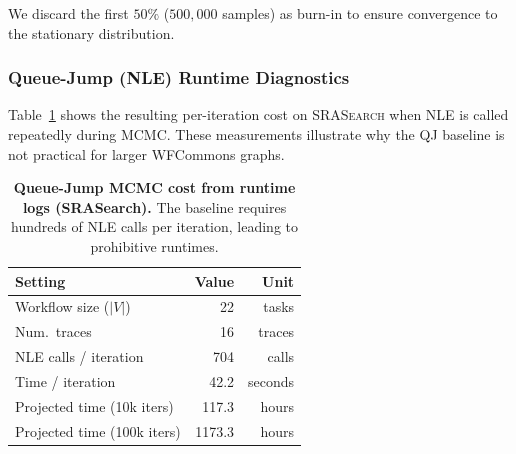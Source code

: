 \documentclass{article}
\theoremstyle{plain}
\theoremstyle{definition}
\theoremstyle{remark}
\begin{document}
We discard the first $50\%$ ($500,000$ samples) as burn-in to ensure convergence to the stationary distribution. 
\subsubsection{Queue-Jump (NLE) Runtime Diagnostics}
\label{app:qj_runtime}
Table~\ref{tab:qj_mcmc_cost} shows the resulting per-iteration
cost on \textsc{SRASearch} when NLE is called repeatedly during MCMC. These measurements illustrate why the QJ baseline
is not practical for larger WFCommons graphs.


\begin{table}[h!]
\centering
\caption{\textbf{Queue-Jump MCMC cost from runtime logs (SRASearch).}
The baseline requires hundreds of NLE calls per iteration, leading to prohibitive runtimes.}
\label{tab:qj_mcmc_cost}
\small
\setlength{\tabcolsep}{5pt}
\begin{tabular}{lrr}
\toprule
\textbf{Setting} & \textbf{Value} & \textbf{Unit} \\
\midrule
Workflow size ($|V|$) & 22 & tasks \\
Num.\ traces          & 16 & traces \\
NLE calls / iteration & 704 & calls \\
Time / iteration      & 42.2 & seconds \\
Projected time (10k iters)  & 117.3 & hours \\
Projected time (100k iters) & 1173.3 & hours \\
\bottomrule
\end{tabular}
\end{table}
\end{document}
